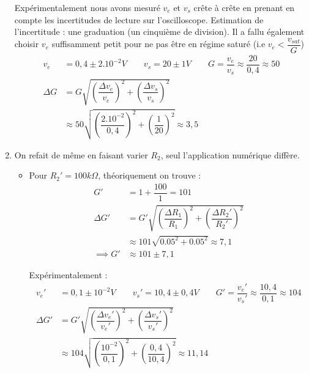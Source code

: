 \documentclass[11pt,a4paper]{article}
\begin{document}
\begin{enumerate}
Expérimentalement nous avons mesuré $v_{e}$ et $v_{s}$ crête à crête en prenant en compte les incertitudes de lecture sur l'oscilloscope. Estimation de l'incertitude : une graduation (un cinquième de division). Il a fallu également choisir $v_{e}$ suffisamment petit pour ne pas être en régime saturé (i.e $v_{e}<\dfrac{v_{sat}}{G}$)
\begin{align*}
v_{e}&=0,4\pm 2.10^{-2}V \qquad v_{s}=20\pm1V \qquad G=\dfrac{v_{e}}{v_{s}}\approx \dfrac{20}{0,4}\approx 50\\
\Delta G&=G\sqrt {\left( \dfrac {\Delta v_{e}} {v_{e}}\right) ^{2}+\left( \dfrac {\Delta v_{s}} {v_{s}}\right) ^{2}}\\
&\approx 50\sqrt {\left( \dfrac {2.10^{-2}} {0,4}\right) ^{2}+\left( \dfrac {1} {20}\right) ^{2}}\approx 3,5
\end{align*}

\item On refait de même en faisant varier $R_{2}$, seul l'application numérique diffère.
\begin{itemize}

\item Pour $R_{2}'=100k\Omega$, théoriquement on trouve :
\begin{align*}
G'&=1+\dfrac{100}{1}=101\\
\Delta G'&=G'\sqrt {\left( \dfrac {\Delta R_{1}} {R_{1}}\right) ^{2}+\left( \dfrac {\Delta R_{2}'} {R_{2}'}\right) ^{2}}\\
&\approx 101\sqrt { 0.05^{2}+0.05 ^{2}} \approx 7,1 \\
\implies G'&\approx 101 \pm7,1
\end{align*}

Expérimentalement :
\begin{align*}
v_{e}'&=0,1\pm 10^{-2}V \qquad v_{s}'=10,4\pm0,4V \qquad G'=\dfrac{v_{e}'}{v_{s}'}\approx \dfrac{10,4}{0,1} \approx 104\\
\Delta G'&=G'\sqrt {\left( \dfrac {\Delta v_{e}'} {v_{e}'}\right) ^{2}+\left( \dfrac {\Delta v_{s}'} {v_{s}'}\right) ^{2}}\\
&\approx 104\sqrt {\left( \dfrac {10^{-2}} {0,1}\right) ^{2}+\left( \dfrac {0,4} {10,4}\right) ^{2}}\approx 11,14
\end{align*}



\end{itemize}
\end{enumerate}
\end{document}
